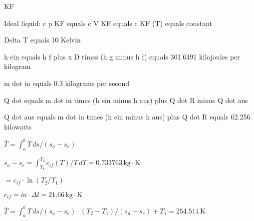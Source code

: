 KF  

Ideal liquid:  
c p KF equals c V KF equals c KF (T) equals constant  

Delta T equals 10 Kelvin  

h ein equals h f plus x D times (h g minus h f) equals 301.6491 kilojoules per kilogram  

m dot in equals 0.3 kilograms per second  

Q dot equals m dot in times (h ein minus h aus) plus Q dot R minus Q dot aus  

Q dot aus equals m dot in times (h ein minus h aus) plus Q dot R equals 62.256 kilowatts

\( \bar{T} = \int_a^b T \, ds / (s_a - s_e) \)  

\( s_a - s_e = \int_{T_1}^{T_2} c_{if}(T) / T \, dT = 0.733763 \, \text{kg} \cdot \text{K} \)  

\( = c_{if} \cdot \ln(T_2 / T_1) \)  

\( c_{if} = \dot{m} \cdot \Delta l = 21.66 \, \text{kg} \cdot \text{K} \)  

\( \bar{T} = \int_a^b T \, ds / (s_a - s_e) \cdot (T_2 - T_1) / (s_a - s_e) + T_1 = 254.514 \, \text{K} \)